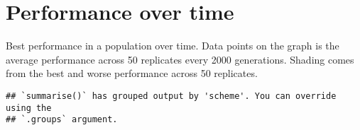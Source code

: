 \documentclass[]{book}
\newenvironment{Shaded}{\begin{snugshade}}{\end{snugshade}}
\newcommand{\DataTypeTok}[1]{\textcolor[rgb]{0.13,0.29,0.53}{#1}}
\newcommand{\KeywordTok}[1]{\textcolor[rgb]{0.13,0.29,0.53}{\textbf{#1}}}
\newcommand{\NormalTok}[1]{#1}
\newcommand{\OperatorTok}[1]{\textcolor[rgb]{0.81,0.36,0.00}{\textbf{#1}}}
\newcommand{\StringTok}[1]{\textcolor[rgb]{0.31,0.60,0.02}{#1}}
\begin{document}
\hypertarget{performance-over-time-2}{%
\section{Performance over time}\label{performance-over-time-2}}

Best performance in a population over time.
Data points on the graph is the average performance across 50 replicates every 2000 generations.
Shading comes from the best and worse performance across 50 replicates.

\begin{Shaded}
\end{Shaded}

\begin{verbatim}
## `summarise()` has grouped output by 'scheme'. You can override using the
## `.groups` argument.
\end{verbatim}
\end{document}
